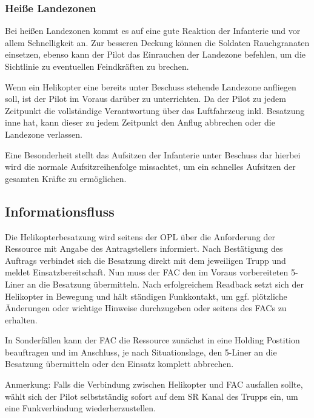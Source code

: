 \subsubsection{Heiße Landezonen}
	Bei heißen Landezonen kommt es auf eine gute Reaktion der Infanterie und vor allem Schnelligkeit an. Zur besseren Deckung können die Soldaten Rauchgranaten einsetzen, ebenso kann der Pilot das Einrauchen der Landezone befehlen, um die Sichtlinie zu eventuellen Feindkräften zu brechen.\par
	Wenn ein Helikopter eine bereits unter Beschuss stehende Landezone anfliegen soll, ist der Pilot im Voraus darüber zu unterrichten. Da der Pilot zu jedem Zeitpunkt die vollständige Verantwortung über das Luftfahrzeug inkl. Besatzung inne hat, kann dieser zu jedem Zeitpunkt den Anflug abbrechen oder die Landezone verlassen.\par
	Eine Besonderheit stellt das Aufsitzen der Infanterie unter Beschuss dar hierbei wird die normale Aufsitzreihenfolge missachtet, um ein schnelles Aufsitzen der gesamten Kräfte zu ermöglichen.

\subsection{Informationsfluss}
	Die Helikopterbesatzung wird seitens der OPL über die Anforderung der Ressource mit Angabe des Antragstellers informiert. Nach Bestätigung des Auftrags verbindet sich die Besatzung direkt mit dem jeweiligen Trupp und meldet Einsatzbereitschaft. Nun muss der FAC den im Voraus vorbereiteten 5-Liner an die Besatzung übermitteln. Nach erfolgreichem Readback setzt sich der Helikopter in Bewegung und hält ständigen Funkkontakt, um ggf. plötzliche Änderungen oder wichtige Hinweise durchzugeben oder seitens des FACs zu erhalten.
	\par\medskip
	In Sonderfällen kann der FAC die Ressource zunächst in eine Holding Postition beauftragen und im Anschluss, je nach Situationslage, den 5-Liner an die Besatzung übermitteln oder den Einsatz komplett abbrechen.
	\par\medskip 
	Anmerkung: Falls die Verbindung zwischen Helikopter und FAC ausfallen sollte, wählt sich der Pilot selbstständig sofort auf dem SR Kanal des Trupps ein, um eine Funkverbindung wiederherzustellen.

